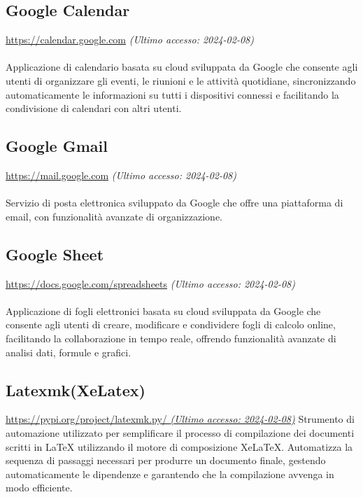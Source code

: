 \documentclass[10pt, a4paper]{article}
\begin{document}
\subsection{Google Calendar}
\href{https://calendar.google.com}{https://calendar.google.com} \textit{(Ultimo accesso: 2024-02-08)}\\\\
Applicazione di calendario basata su cloud sviluppata da Google che consente agli utenti di organizzare gli eventi, le riunioni e le attività quotidiane, sincronizzando automaticamente
le informazioni su tutti i dispositivi connessi e facilitando la condivisione di calendari con altri utenti.

\subsection{Google Gmail}
\href{https://mail.google.com}{https://mail.google.com} \textit{(Ultimo accesso: 2024-02-08)}\\\\
Servizio di posta elettronica sviluppato da Google che offre una piattaforma di email, con funzionalità avanzate di organizzazione.

\subsection{Google Sheet}
\href{https://docs.google.com/spreadsheets}{https://docs.google.com/spreadsheets} \textit{(Ultimo accesso: 2024-02-08)}\\\\
Applicazione di fogli elettronici basata su cloud sviluppata da Google che consente agli utenti di creare, modificare e condividere fogli di calcolo online, facilitando la 
collaborazione in tempo reale, offrendo funzionalità avanzate di analisi dati, formule e grafici.

\subsection{Latexmk(XeLatex)}
\href{https://pypi.org/project/latexmk.py/}{https://pypi.org/project/latexmk.py/ \textit{(Ultimo accesso: 2024-02-08)}}
Strumento di automazione utilizzato per semplificare il processo di compilazione dei documenti scritti in LaTeX utilizzando il motore di composizione XeLaTeX. Automatizza 
la sequenza di passaggi necessari per produrre un documento finale, gestendo automaticamente le dipendenze e garantendo che la compilazione avvenga in modo efficiente.
\end{document}
